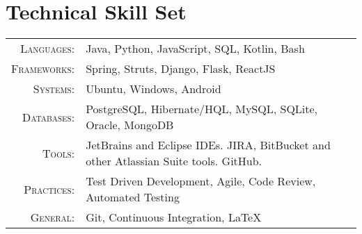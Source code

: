 \section{Technical Skill Set}

\begin{tabular}{r|p{11cm}}
	\textsc{Languages}: & Java, Python, JavaScript, SQL, Kotlin, Bash \\
	\textsc{Frameworks}: & Spring, Struts, Django, Flask, ReactJS \\
	\textsc{Systems}: & Ubuntu, Windows, Android \\
	\textsc{Databases}: & PostgreSQL, Hibernate/HQL, MySQL, SQLite, Oracle, MongoDB \\
	\textsc{Tools}: & JetBrains and Eclipse IDEs. JIRA, BitBucket and other Atlassian Suite tools. GitHub. \\
	\textsc{Practices}: & Test Driven Development, Agile, Code Review, Automated Testing \\
	\textsc{General}: & Git, Continuous Integration, LaTeX \\
\end{tabular}
